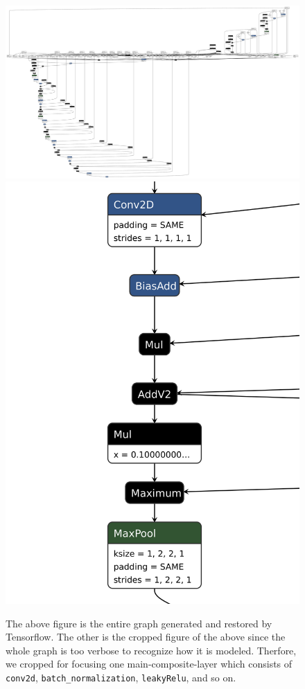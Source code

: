 \documentclass[a4paper,12pt]{article}
\begin{document}
\begin{figure}
	\centering
	\includegraphics[width=\textwidth]{./model}
	\includegraphics[height=0.5\textheight]{./model_crop3}
	\caption{The above figure is the entire graph generated and restored by Tensorflow. 
	The other is the cropped figure of the above since the whole graph is too verbose to recognize how it is modeled.
	Therfore, we cropped for focusing one main-composite-layer which consists of \lstinline{conv2d}, \lstinline{batch_normalization}, \lstinline{leakyRelu}, and so on.
	}
	\label{figure:graph}
\end{figure}
\end{document}
